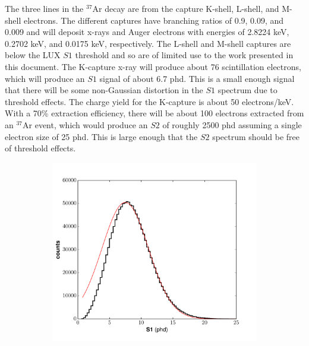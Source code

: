 {The three lines in the $^{37}$Ar decay are from the capture K-shell, L-shell, and M-shell electrons. The different captures have branching ratios of 0.9, 0.09, and 0.009 and will deposit x-rays and Auger electrons with energies of 2.8224 keV, 0.2702 keV, and 0.0175 keV, respectively. The L-shell and M-shell captures are below the LUX $S1$ threshold and so are of limited use to the work presented in this document. The K-capture x-ray will produce about 76 scintillation electrons, which will produce an $S1$ signal of about 6.7 phd. This is a small enough signal that there will be some non-Gaussian distortion in the $S1$ spectrum due to threshold effects. The charge yield for the K-capture is about 50 electrons/keV. With a 70\% extraction efficiency, there will be about 100 electrons extracted from an $^{37}$Ar event, which would produce an $S2$ of roughly 2500 phd assuming a single electron size of 25 phd. This is large enough that the $S2$ spectrum should be free of threshold effects.
\begin{figure}[h!]
\centering
\begin{subfigure}{0.5\textwidth}
  \centering
  \includegraphics[width=\textwidth]{Figures/Ar37_S1spec.pdf}
\end{subfigure}%
\begin{subfigure}{0.5\textwidth}
  \centering

\end{subfigure}
\end{figure}}
